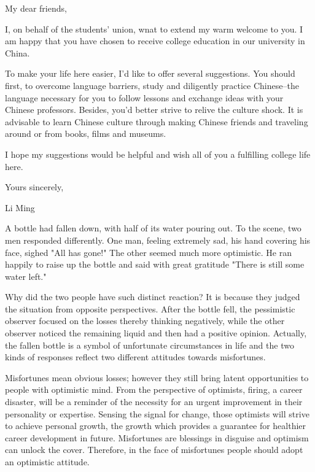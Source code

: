 My dear friends,

I, on behalf of the students' union, wnat to extend my warm welcome to you. I am happy that you have chosen to receive college education in our university in China.

To make your life here easier, I'd like to offer several suggestions. You should first, to overcome language barriers, study and diligently practice Chinese--the language necessary for you to follow lessons and exchange ideas with your Chinese professors. Besides, you'd better strive to relive the culture shock. It is advisable to learn Chinese culture through making Chinese friends and traveling around or from books, films and museums.

I hope my suggestions would be helpful and wish all of you a fulfilling college life here.

\begin{flushright}Yours sincerely,

Li Ming\end{flushright}

A bottle had fallen down, with half of its water pouring out. To the scene, two men responded differently. One man, feeling extremely sad, his hand covering his face, sighed "All has gone!" The other seemed much more optimistic. He ran happily to raise up the bottle and said with great gratitude "There is still some water left."

Why did the two people have such distinct reaction? It is because they judged the situation from opposite perspectives. After the bottle fell, the pessimistic observer focused on the losses thereby thinking negatively, while the other observer noticed the remaining liquid and then had a positive opinion. Actually, the fallen bottle is a symbol of unfortunate circumstances in life and the two kinds of responses reflect two different attitudes towards misfortunes.

Misfortunes mean obvious losses; however they still bring latent opportunities to people with optimistic mind. From the perspective of optimists, firing, a career disaster, will be a reminder of the necessity for an urgent improvement in their personality or expertise. Sensing the signal for change, those optimists will strive to achieve personal growth, the growth which provides a guarantee for healthier career development in future. Misfortunes are blessings in disguise and optimism can unlock the cover. Therefore, in the face of misfortunes people should adopt an optimistic attitude.